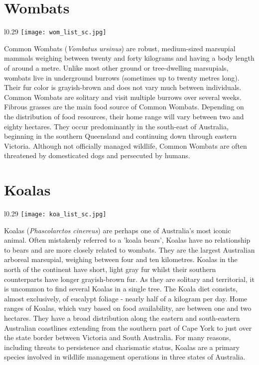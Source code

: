 \section{Wombats}\label{wom}
\vspace{-0.3cm}
\setlength\intextsep{0pt}
\begin{wrapfigure}{l}{0.29\textwidth}
\centering
\texttt{[image: wom\_list\_sc.jpg]}
\end{wrapfigure}
Common Wombats (\textit{Vombatus ursinus}) are robust, medium-sized marsupial mammals weighing between twenty and forty kilograms and having a body length of around a metre. Unlike most other ground or tree-dwelling marsupials, wombats live in underground burrows (sometimes up to twenty metres long). Their fur color is grayish-brown and does not vary much between individuals. Common Wombats are solitary and visit multiple burrows over several weeks. Fibrous grasses are the main food source of Common Wombats. Depending on the distribution of food resources, their home range will vary between two and eighty hectares. They occur predominantly in the south-east of Australia, beginning in the southern Queensland and continuing down through eastern Victoria. Although not officially managed wildlife, Common Wombats are often threatened by domesticated dogs and persecuted by humans.

\section{Koalas}\label{koa}
\vspace{-0.3cm}
\setlength\intextsep{0pt}
\begin{wrapfigure}{l}{0.29\textwidth}
\centering
\texttt{[image: koa\_list\_sc.jpg]}
\end{wrapfigure}
Koalas (\textit{Phascolarctos cinereus}) are perhaps one of Australia's most iconic animal. Often mistakenly referred to a 'koala bears', Koalas have no relationship to bears and are more closely related to wombats. They are the largest Australian arboreal marsupial, weighing between four and ten kilometres. Koalas in the north of the continent have short, light gray fur whilst their southern counterparts have longer grayish-brown fur. As they are solitary and territorial, it is uncommon to find several Koalas in a single tree. The Koala diet consists, almost exclusively, of eucalypt foliage - nearly half of a kilogram per day. Home ranges of Koalas, which vary based on food availability, are between one and two hectares. They have a broad distribution along the eastern and south-eastern Australian coastlines extending from the southern part of Cape York to just over the state border between Victoria and South Australia. For many reasons, including threats to persistence and charismatic status, Koalas are a primary species involved in wildlife management operations in three states of Australia.


